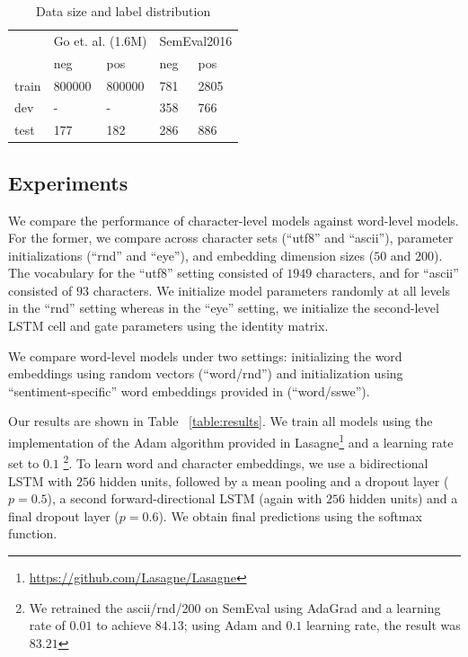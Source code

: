 \documentclass{article} %
\begin{document}
\begin{table}[h!]
\centering
\caption{Data size and label distribution}
\label{my-label}
\begin{tabular}{|lllll|}
\hline
      & \multicolumn{2}{l}{Go et. al. (1.6M)} & \multicolumn{2}{l}{SemEval2016} \\
      & neg               & pos               & neg            & pos            \\
\hline
train & 800000            & 800000            & 781            & 2805           \\
dev   & -                 & -                 & 358            & 766            \\
test  & 177               & 182               & 286            & 886           \\
\hline
\end{tabular}
\end{table}

\subsection{Experiments}
We compare the performance of character-level models against word-level models. For the former, we compare across character sets (``utf8'' and ``ascii''), parameter initializations (``rnd'' and ``eye''), and embedding dimension sizes ($50$ and $200$). The vocabulary for the ``utf8'' setting consisted of $1949$ characters, and for ``ascii'' consisted of $93$ characters. We initialize model parameters randomly at all levels in the ``rnd'' setting whereas in the ``eye'' setting, we initialize the second-level LSTM cell and gate parameters using the identity matrix.

We compare word-level models under two settings: initializing the word embeddings using random vectors (``word/rnd'') and initialization using ``sentiment-specific'' word embeddings provided in \cite{tang2014learning} (``word/sswe'').

Our results are shown in Table ~\ref{table:results}. We train all models using the implementation of the Adam algorithm \cite{kingma2014adam} provided in Lasagne\footnote{\url{https://github.com/Lasagne/Lasagne}} and a learning rate set to $0.1$ \footnote{We retrained the ascii/rnd/200 on SemEval using AdaGrad and a learning rate of $0.01$ to achieve $84.13$; using Adam and $0.1$ learning rate, the result was $83.21$}. To learn word and character embeddings, we use a bidirectional LSTM with $256$ hidden units, followed by a mean pooling and a dropout layer ($p=0.5$), a second forward-directional LSTM (again with $256$ hidden units) and a final dropout layer ($p=0.6$). We obtain final predictions using the softmax function.
\end{document}
